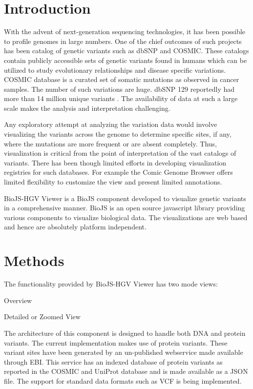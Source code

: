 \documentclass[twoside]{article}
\begin{document}
\begin{multicols}{2} %

\section{Introduction}

\lettrine[nindent=0em,lines=3]{W} 
ith the advent of next-generation sequencing technologies, it has been possible to profile genomes in large numbers. One of the chief outcomes of such projects has been catalog of genetic variants such as dbSNP\cite{Smigielski2000} and COSMIC\cite{Forbes2011}. These catalogs contain publicly accessible sets of genetic variants found in humans which can be utilized to  study evolutionary relationships and disease specific variations. COSMIC database is a curated set of somatic mutations as observed in cancer samples. The number of such variations are   huge. dbSNP 129  reportedly had more than 14 million unique variants \cite{ncbiweb}. The availability of data at such a large scale makes the analysis and interpretation challenging.

Any exploratory attempt at analyzing the variation data would involve visualizing the variants across the genome to determine specific sites, if any, where the mutations are more frequent or are absent completely. Thus, visualization is critical from the point of interpretation of the vast catalogs of variants. There has been though limited efforts in developing visualization registries for such databases. For example the Comic Genome Browser\cite{Forbes2011} offers limited flexibility to customize the view and present limited annotations.

 BioJS-HGV Viewer is a BioJS \cite{Corpas2014} component developed to visualize genetic variants in a comprehensive manner. BioJS is an open source javascript library providing various components to visualize biological data. The visualizations are web based and hence are absolutely platform independent.
 
 

\section{Methods}
The functionality provided by BioJS-HGV Viewer has two mode views:
\begin{compactitem}
\item Overview
\item Detailed or Zoomed View
\end{compactitem}
The architecture of this component is designed to handle both DNA and protein variants. The current implementation makes use of protein variants. These variant sites have been generated by an un-published webservice made available through EBI. This service has an indexed database of protein variants as reported in the COSMIC and UniProt\cite{Wu2006} database and is made available as a JSON\cite{json} file. The support for standard data formats such as VCF\cite{vcf} is being implemented.




\end{multicols}
\end{document}
